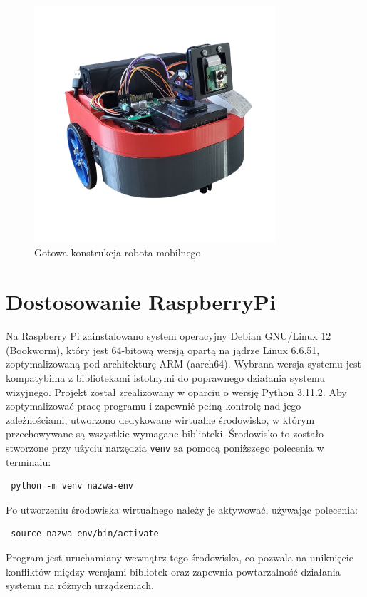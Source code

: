 \documentclass[a4paper,twoside,12pt]{book}
\begin{document}
\begin{figure}[h]
    \centering
    \includegraphics[width=0.8\textwidth]{Images/Robot/Robot_gotowy.png}
    \caption{Gotowa konstrukcja robota mobilnego.}
    \label{fig:Robot_gotowy}
\end{figure}

\newpage

\section{Dostosowanie RaspberryPi}
Na Raspberry Pi zainstalowano system operacyjny Debian GNU/Linux 12 (Bookworm), który jest 64-bitową wersją opartą na jądrze Linux 6.6.51, zoptymalizowaną pod architekturę ARM (aarch64). Wybrana wersja systemu jest kompatybilna z bibliotekami istotnymi do poprawnego działania systemu wizyjnego. Projekt został zrealizowany w oparciu o wersję Python 3.11.2. Aby zoptymalizować pracę programu i zapewnić pełną kontrolę nad jego zależnościami, utworzono dedykowane wirtualne środowisko, w którym przechowywane są wszystkie wymagane biblioteki. Środowisko to zostało stworzone przy użyciu narzędzia \texttt{venv} za pomocą poniższego polecenia w terminalu: \begin{verbatim} python -m venv nazwa-env \end{verbatim} Po utworzeniu środowiska wirtualnego należy je aktywować, używając polecenia: \begin{verbatim} source nazwa-env/bin/activate \end{verbatim} Program jest uruchamiany wewnątrz tego środowiska, co pozwala na uniknięcie konfliktów między wersjami bibliotek oraz zapewnia powtarzalność działania systemu na różnych urządzeniach.
\end{document}
